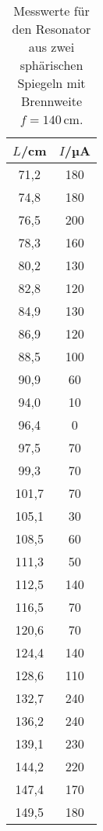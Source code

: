 \begin{table}[htp]
  \caption{Messwerte für den Resonator aus zwei sphärischen Spiegeln mit Brennweite $f=140$\,cm.}
  \label{tab:konkavkonkav}
	\begin{center}
		\begin{tabular}{cc}
		\toprule
			{$L$/cm} & {$I$/µA}\\
			\midrule
			71,2 & 180\\
			74,8 & 180\\
			76,5 & 200\\
			78,3 & 160\\
			80,2 & 130\\
			82,8 & 120\\
			84,9 & 130\\
			86,9 & 120\\
			88,5 & 100\\
			90,9 & 60\\
			94,0 & 10\\
			96,4 & 0\\
			97,5 & 70\\
			99,3 & 70\\
			101,7 & 70\\
			105,1 & 30\\
			108,5 & 60\\
			111,3 & 50\\
			112,5 & 140\\
			116,5 & 70\\
			120,6 & 70\\
			124,4 & 140\\
			128,6 & 110\\
			132,7 & 240\\
			136,2 & 240\\
			139,1 & 230\\
			144,2 & 220\\
			147,4 & 170\\
			149,5 & 180\\
		\bottomrule
		\end{tabular}
	\end{center}
\end{table}

